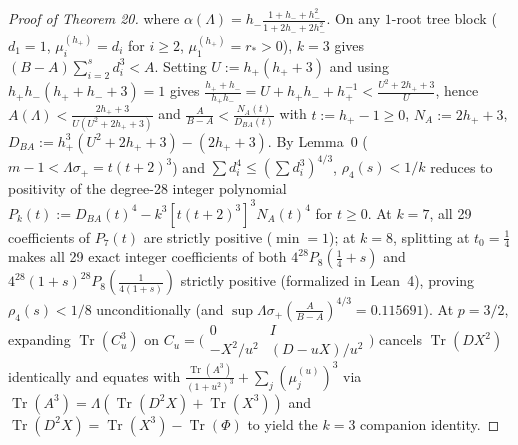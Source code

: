 \documentclass[10pt,letterpaper]{article}
\newcommand{\Tr}{\operatorname{Tr}}
\begin{document}
\begin{proof}[Proof of Theorem 20]
where $\alpha(\Lambda) = h_-\frac{1+h_-+h_-^2}{1+2h_-+2h_-^2}$. On any $1$-root tree block ($d_1 = 1$, $\mu_i^{(h_+)} = d_i$ for $i \ge 2$, $\mu_1^{(h_+)} = r_* > 0$), $k = 3$ gives $(B - A)\sum_{i=2}^s d_i^3 < A$. Setting $U := h_+(h_++3)$ and using $h_+ h_-(h_++h_-+3) = 1$ gives $\frac{h_++h_-}{h_+ h_-} = U + h_+ h_- + h_+^{-1} < \frac{U^2 + 2h_+ + 3}{U}$, hence $A(\Lambda) < \frac{2h_+ + 3}{U(U^2 + 2h_+ + 3)}$ and $\frac{A}{B-A} < \frac{N_A(t)}{D_{BA}(t)}$ with $t := h_+ - 1 \ge 0$, $N_A := 2h_+ + 3$, $D_{BA} := h_+^3(U^2 + 2h_+ + 3) - (2h_+ + 3)$. By Lemma~0 ($m-1 < \Lambda\sigma_+ = t(t+2)^3$) and $\sum d_i^4 \le (\sum d_i^3)^{4/3}$, $\rho_4(s) < 1/k$ reduces to positivity of the degree-28 integer polynomial $P_k(t) := D_{BA}(t)^4 - k^3[t(t+2)^3]^3 N_A(t)^4$ for $t \ge 0$. At $k = 7$, all 29 coefficients of $P_7(t)$ are strictly positive ($\min = 1$); at $k = 8$, splitting at $t_0 = \frac{1}{4}$ makes all 29 exact integer coefficients of both $4^{28} P_8(\frac{1}{4}+s)$ and $4^{28}(1+s)^{28} P_8(\frac{1}{4(1+s)})$ strictly positive (formalized in Lean~4), proving $\rho_4(s) < 1/8$ unconditionally (and $\sup \Lambda\sigma_+(\frac{A}{B-A})^{4/3} = 0.115691$). At $p = 3/2$, expanding $\Tr(C_u^3)$ on $C_u = \bigl(\begin{smallmatrix} 0 & I \\ -X^2/u^2 & (D-uX)/u^2 \end{smallmatrix}\bigr)$ cancels $\Tr(DX^2)$ identically and equates with $\frac{\Tr(A^3)}{(1+u^2)^3} + \sum_j (\mu_j^{(u)})^3$ via $\Tr(A^3) = \Lambda(\Tr(D^2 X) + \Tr(X^3))$ and $\Tr(D^2 X) = \Tr(X^3) - \Tr(\Phi)$ to yield the $k = 3$ companion identity.


\end{proof}
\end{document}
